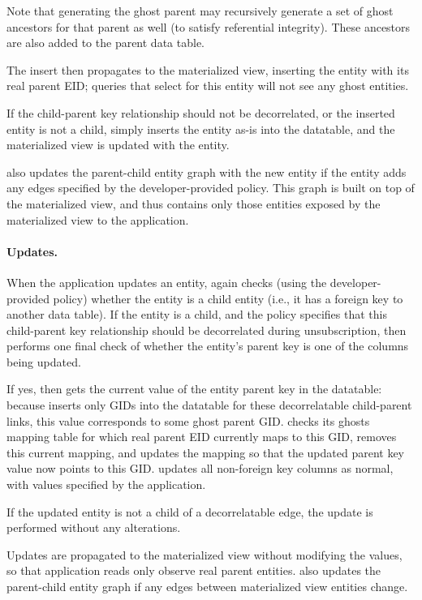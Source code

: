Note that generating the ghost parent may recursively generate a set of ghost ancestors for that
parent as well (to satisfy referential integrity). These ancestors are also added to the parent data
table.

The insert then propagates to the materialized view, inserting the entity with its real parent EID; queries that
select for this entity will not see any ghost entities. 

If the child-parent key relationship should not be decorrelated, or the inserted entity is not a
child, \sys{} simply inserts the entity as-is into the datatable, and the materialized view is
updated with the entity.

\sys{} also updates the parent-child entity graph with the new entity if the entity adds any edges
specified by the developer-provided policy. This graph is built on top of the materialized view, and
thus contains only those entities exposed by the materialized view to the application.

\paragraph{Updates.}
When the application updates an entity, \sys{} again checks (using the developer-provided policy) whether
the entity is a child entity (i.e., it has a foreign key to another data table). 
If the entity is a child, and the policy specifies that this child-parent key
relationship should be decorrelated during unsubscription, then \sys{} performs one final check of
whether the entity's parent key is one of the columns being updated.

If yes, then \sys{} gets the current value of the entity parent key in the datatable: because \sys{}
inserts only GIDs into the datatable for these decorrelatable child-parent links, this value 
corresponds to some ghost parent GID.
\sys{} checks its ghosts mapping table for which real parent EID currently maps to this GID, removes
this current mapping, and updates the mapping so that the updated parent key value now points to
this GID.
\sys{} updates all non-foreign key columns as normal, with values specified by the application.

If the updated entity is not a child of a decorrelatable edge, the update is performed without any
alterations.

Updates are propagated to the materialized view without modifying the values, so that application
reads only observe real parent entities.
\sys{} also updates the parent-child entity graph if any edges between materialized view entities change.

